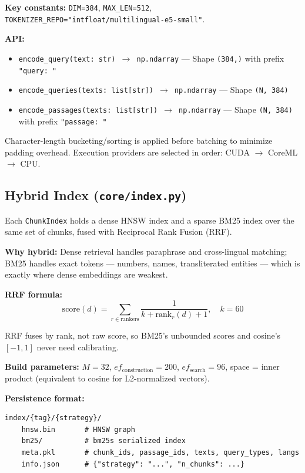 \documentclass[12pt,a4paper]{article}
\begin{document}
\textbf{Key constants:} \texttt{DIM=384}, \texttt{MAX\_LEN=512}, \texttt{TOKENIZER\_REPO="intfloat/multilingual-e5-small"}.

\textbf{API:}
\begin{itemize}
    \item \texttt{encode\_query(text: str) $\to$ np.ndarray} --- Shape \texttt{(384,)} with prefix \texttt{"query: "}
    \item \texttt{encode\_queries(texts: list[str]) $\to$ np.ndarray} --- Shape \texttt{(N, 384)}
    \item \texttt{encode\_passages(texts: list[str]) $\to$ np.ndarray} --- Shape \texttt{(N, 384)} with prefix \texttt{"passage: "}
\end{itemize}

Character-length bucketing/sorting is applied before batching to minimize padding overhead. Execution providers are selected in order: CUDA $\to$ CoreML $\to$ CPU.


\subsection{Hybrid Index (\texttt{core/index.py})}

Each \texttt{ChunkIndex} holds a dense HNSW index and a sparse BM25 index over the same set of chunks, fused with Reciprocal Rank Fusion (RRF).

\textbf{Why hybrid:} Dense retrieval handles paraphrase and cross-lingual matching; BM25 handles exact tokens --- numbers, names, transliterated entities --- which is exactly where dense embeddings are weakest.

\textbf{RRF formula:}
$$\text{score}(d) = \sum_{r \in \text{rankers}} \frac{1}{k + \text{rank}_r(d) + 1}, \quad k = 60$$

RRF fuses by rank, not raw score, so BM25's unbounded scores and cosine's $[-1, 1]$ never need calibrating.

\textbf{Build parameters:} $M=32$, $ef_{\text{construction}}=200$, $ef_{\text{search}}=96$, space = inner product (equivalent to cosine for L2-normalized vectors).

\textbf{Persistence format:}
\begin{lstlisting}[style=bashstyle, language={}]
index/{tag}/{strategy}/
    hnsw.bin       # HNSW graph
    bm25/          # bm25s serialized index
    meta.pkl       # chunk_ids, passage_ids, texts, query_types, langs
    info.json      # {"strategy": "...", "n_chunks": ...}
\end{lstlisting}
\end{document}
